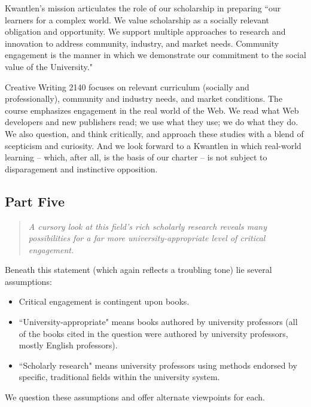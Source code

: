 \documentclass[letterpaper,10pt,headsepline]{scrreprt}
\begin{document}
Kwantlen's mission articulates the role of our scholarship in preparing ``our learners for a complex world. We value scholarship as a socially relevant obligation and opportunity. We support multiple approaches to research and innovation to address community, industry, and market needs. Community engagement is the manner in which we demonstrate our commitment to the social value of the University."

Creative Writing 2140 focuses on relevant curriculum (socially and professionally), community and industry needs, and market conditions. The course emphasizes engagement in the real world of the Web. We read what Web developers and new publishers read; we use what they use; we do what they do. We also question, and think critically, and approach these studies with a blend of scepticism and curiosity. And we look forward to a Kwantlen in which real-world learning -- which, after all, is the basis of our charter -- is not subject to disparagement and instinctive opposition.

\subsection{Part Five}

\begin{quote}
\textit{A cursory look at this field’s rich scholarly research reveals many possibilities for a far more university-appropriate level of critical engagement.}
\end{quote}

Beneath this statement (which again reflects a troubling tone) lie several assumptions:

\begin{itemize}

\item Critical engagement is contingent upon books.

\item ``University-appropriate" means books authored by university professors (all of the books cited in the question were authored by university professors, mostly English professors).

\item ``Scholarly research" means university professors using methods endorsed by specific, traditional fields within the university system.

\end{itemize}

We question these assumptions and offer alternate viewpoints for each.
\end{document}

